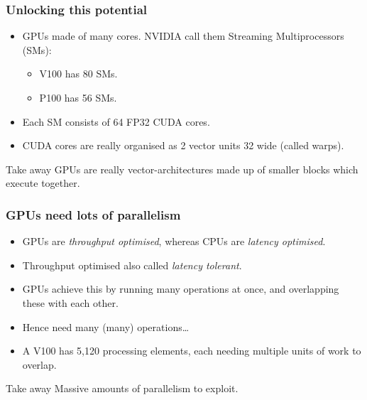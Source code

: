 \documentclass[aspectratio=169]{beamer}
\begin{document}
\begin{frame}
\frametitle{Unlocking this potential}
\begin{itemize}
  \item GPUs made of many cores. NVIDIA call them Streaming Multiprocessors (SMs):
    \begin{itemize}
      \item V100 has 80 SMs.
      \item P100 has 56 SMs.
    \end{itemize}
  \item Each SM consists of 64 FP32 CUDA cores.
  \item CUDA cores are really organised as 2 vector units 32 wide (called warps).
\end{itemize}

\begin{block}{Take away}
GPUs are really vector-architectures made up of smaller blocks which execute together.
\end{block}
\end{frame}

\begin{frame}
\frametitle{GPUs need lots of parallelism}
\begin{itemize}
  \item GPUs are \emph{throughput optimised}, whereas CPUs are \emph{latency optimised}.
  \item Throughput optimised also called \emph{latency tolerant}.
  \item GPUs achieve this by running many operations at once, and overlapping these with each other.
  \item Hence need many (many) operations\dots
  \item A V100 has 5,120 processing elements, each needing multiple units of work to overlap.
\end{itemize}
\begin{block}{Take away}
Massive amounts of parallelism to exploit.
\end{block}
\end{frame}

\end{document}
